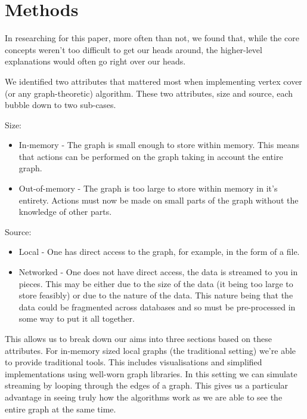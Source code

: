 \section{Methods}

In researching for this paper, more often than not, we found that, while
the core concepts weren't too difficult to get our heads around, the
higher-level explanations would often go right over our heads.

We identified two attributes that mattered most when implementing vertex
cover (or any graph-theoretic) algorithm. These two attributes, size and
source, each bubble down to two sub-cases.

Size:

\begin{itemize}
    \item
          In-memory - The graph is small enough to store within memory. This
          means that actions can be performed on the graph taking in account the
          entire graph.
    \item
          Out-of-memory - The graph is too large to store within memory in it's
          entirety. Actions must now be made on small parts of the graph without
          the knowledge of other parts.
\end{itemize}

Source:

\begin{itemize}
    \item
          Local - One has direct access to the graph, for example, in the form
          of a file.
    \item
          Networked - One does not have direct access, the data is streamed to
          you in pieces. This may be either due to the size of the data (it
          being too large to store feasibly) or due to the nature of the data.
          This nature being that the data could be fragmented across databases
          and so must be pre-processed in some way to put it all together.
\end{itemize}

This allows us to break down our aims into three sections based on these
attributes. For in-memory sized local graphs (the traditional setting)
we're able to provide traditional tools. This includes visualisations
and simplified implementations using well-worn graph libraries. In this
setting we can simulate streaming by looping through the edges of a
graph. This gives us a particular advantage in seeing truly how the
algorithms work as we are able to see the entire graph at the same time.

